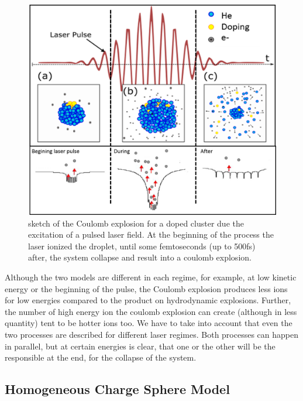 \begin{figure}[h!]
\centering
\includegraphics[width=14cm]{../Images/cluster_regimes_2.png}
\caption{sketch of the Coulomb explosion for a doped cluster due the excitation of a pulsed laser field. At the beginning of the process the laser ionized the droplet, until some femtoseconds (up to 500fs) after, the system collapse and result into a coulomb explosion.}
\label{fig:columbexplosion}

\end{figure}


Although the two models are different in each regime, for example, at low kinetic energy or the beginning of the pulse, the Coulomb explosion produces less ions for low energies compared to the product on hydrodynamic explosions. Further, the number of high energy ion the coulomb explosion can create (although in less quantity) tent to be hotter ions too.
We have to take into account that even the two processes are described for different laser regimes. Both processes can happen in parallel, but at certain energies is clear, that one or the other will be the responsible at the end, for the collapse of the system.

\subsection{Homogeneous Charge Sphere  Model}

